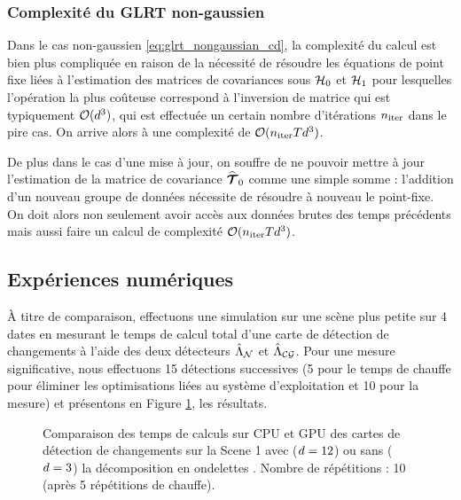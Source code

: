 \subsubsection{Complexité du GLRT non-gaussien}

Dans le cas non-gaussien \eqref{eq:glrt_nongaussian_cd}, la complexité du calcul est bien plus compliquée en raison de la nécessité de résoudre les équations de point fixe liées à l'estimation des matrices de covariances sous $\mathcal{H}_0$ et $\mathcal{H}_1$ pour lesquelles l'opération la plus coûteuse correspond à l'inversion de matrice qui est typiquement $\mathcal{O}(d ^3)$, qui est effectuée un certain nombre d'itérations $n_{\mathrm{iter}}$ dans le pire cas. On arrive alors à une complexité de $\mathcal{O}(n_{\mathrm{iter}}Td^3)$.


De plus dans le cas d'une mise à jour, on souffre de ne pouvoir mettre à jour l'estimation de la matrice de covariance $\widehat{\bm{\mathcal{T}}}_0$ comme une simple somme : l'addition d'un nouveau groupe de données nécessite de résoudre à nouveau le point-fixe. On doit alors non seulement avoir accès aux données brutes des temps précédents mais aussi faire un calcul de complexité $\mathcal{O}(n_{\mathrm{iter}}Td^3)$.

\subsection{Expériences numériques}

À titre de comparaison, effectuons une simulation sur une scène plus petite sur 4 dates en mesurant le temps de calcul total d'une carte de détection de changements à l'aide des deux détecteurs $\hat{\Lambda}_{\mathcal{N}}$ et $\hat{\Lambda}_{\mathcal{CG}}$. Pour une mesure significative, nous effectuons 15 détections successives (5 pour le temps de chauffe pour éliminer les optimisations liées au système d'exploitation et 10 pour la mesure) et présentons en Figure \ref{fig:benchmark_sar_offline}, les résultats.

\begin{figure}[htbp]
  
  
  \caption{Comparaison des temps de calculs sur CPU et GPU des cartes de détection de changements sur la Scene 1 avec ($d=12$) ou sans ($d=3$) la décomposition en ondelettes \cite{Mian_wavelet_2019}. Nombre de répétitions : 10 (après 5 répétitions de chauffe).}
  \label{fig:benchmark_sar_offline}
\end{figure}



